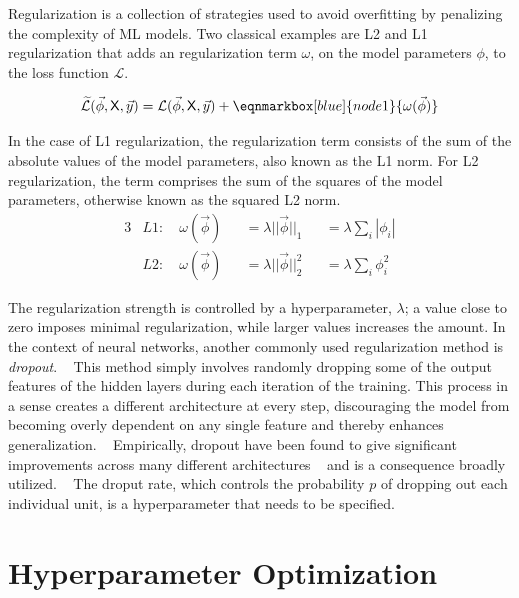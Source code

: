 Regularization is a collection of strategies used to avoid
overfitting by penalizing the complexity of \ac{ML} models.
Two classical examples are L2 and L1 regularization
that adds an regularization term \(\omega\),
on the model parameters \(\phi\),
to the loss function \(\mathcal{L}\).
~\autocite{goodfellow2016deep}

\vspace{1.5em}
\begin{equation}
    \widetilde{\mathcal{L}} (\vec{\phi} , \mathsf{X}, \vec{y}) =
    \mathcal{L} (\vec{\phi} , \mathsf{X}, \vec{y}) +
    \eqnmarkbox[blue]{node1}{ \omega (\vec{\phi})}
\end{equation}

In the case of L1 regularization, 
the regularization term consists of 
the sum of the absolute values of the model parameters, 
also known as the L1 norm. 
For L2 regularization, 
the term comprises the sum of the squares of the model parameters, 
otherwise known as the squared L2 norm.
~\autocite{murphyMachine2012}
%
\begin{alignat}{3}
    &L1: \quad \omega (\vec{\phi}) 
        &&= \lambda||\vec{\phi}||_1 
        &&= \lambda\sum_{i}|\phi_i|  \\
    &L2: \quad \omega (\vec{\phi}) 
        &&= \lambda||\vec{\phi}||_2^2 
        &&= \lambda\sum_{i} \phi_i^2
\end{alignat}

The regularization strength is controlled by a hyperparameter, \(\lambda\);
a value close to zero imposes minimal regularization, 
while larger values increases the amount.
In the context of neural networks, 
another commonly used regularization method is \textit{dropout}.
~\autocite{srivastava2014dropout}
This method simply involves randomly dropping some of the output features
of the hidden layers during each iteration of the training.
This process in a sense creates a different architecture at every step, discouraging the model from becoming overly dependent on any single feature 
and thereby enhances generalization. 
~\autocite{charniakIntroduction2019}
Empirically, dropout have been found to give significant improvements across
many different architectures 
~\autocite{srivastava2014dropout}
and is a consequence broadly utilized.
~\autocite{charniakIntroduction2019}
The droput rate, which controls the probability \(p\) of dropping out each
individual unit, is a hyperparameter that needs to be specified.

\section{Hyperparameter Optimization}

